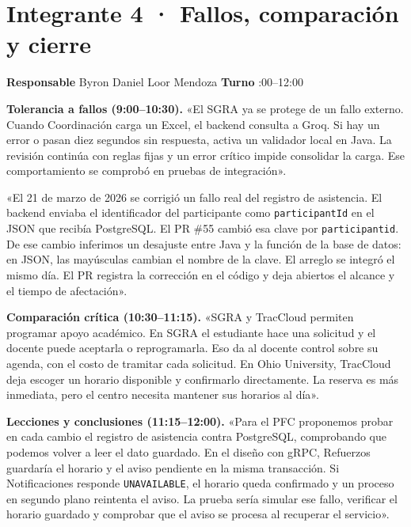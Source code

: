 \documentclass[10pt,a4paper]{article}
\begin{document}
\section*{Integrante 4 · Fallos, comparación y cierre}

\textbf{Responsable} \quad Byron Daniel Loor Mendoza \hfill \textbf{Turno} :00--12:00

\textbf{Tolerancia a fallos (9:00--10:30).}
«El SGRA ya se protege de un fallo externo. Cuando Coordinación carga un Excel, el backend consulta a Groq. Si hay un error o pasan diez segundos sin respuesta, activa un validador local en Java. La revisión continúa con reglas fijas y un error crítico impide consolidar la carga. Ese comportamiento se comprobó en pruebas de integración». \cite[pp.~66 y 142]{informeSgra}

«El 21 de marzo de 2026 se corrigió un fallo real del registro de asistencia. El backend enviaba el identificador del participante como \texttt{participantId} en el JSON que recibía PostgreSQL. El PR \#55 cambió esa clave por \texttt{participantid}. De ese cambio inferimos un desajuste entre Java y la función de la base de datos: en JSON, las mayúsculas cambian el nombre de la clave. El arreglo se integró el mismo día. El PR registra la corrección en el código y deja abiertos el alcance y el tiempo de afectación». \cite{sgraAsistencia}

\textbf{Comparación crítica (10:30--11:15).}
«SGRA y TracCloud permiten programar apoyo académico. En SGRA el estudiante hace una solicitud y el docente puede aceptarla o reprogramarla. Eso da al docente control sobre su agenda, con el costo de tramitar cada solicitud. En Ohio University, TracCloud deja escoger un horario disponible y confirmarlo directamente. La reserva es más inmediata, pero el centro necesita mantener sus horarios al día». \cite{informeSgra,traccloudOhio}

\begin{samepage}
\textbf{Lecciones y conclusiones (11:15--12:00).}
«Para el PFC proponemos probar en cada cambio el registro de asistencia contra PostgreSQL, comprobando que podemos volver a leer el dato guardado. En el diseño con gRPC, Refuerzos guardaría el horario y el aviso pendiente en la misma transacción. Si Notificaciones responde \texttt{UNAVAILABLE}, el horario queda confirmado y un proceso en segundo plano reintenta el aviso. La prueba sería simular ese fallo, verificar el horario guardado y comprobar que el aviso se procesa al recuperar el servicio».


\end{samepage}
\end{document}
